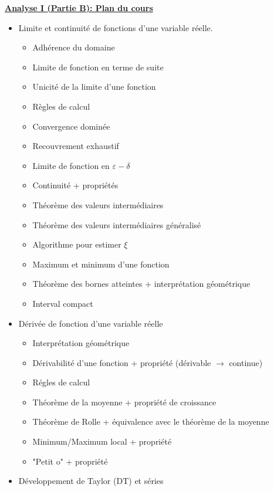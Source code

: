 \documentclass[a4paper,11pt]{report}
\begin{document}
\begin{center} 
   \underline{\textbf{Analyse I (Partie B): Plan du cours}} 
\end{center} 
\renewcommand{\labelitemi}{$\bullet$}
\renewcommand{\labelitemii}{$\cdot$}
\renewcommand{\labelitemiii}{$\diamond$}
\renewcommand{\labelitemiv}{$\ast$}
\begin{itemize}
	\item Limite et continuité de fonctions d'une variable réelle.
	\begin{itemize}
		\item Adhérence du domaine
		\item Limite de fonction en terme de suite
		\item Unicité de la limite d'une fonction
		\item Règles de calcul
		\item Convergence dominée
		\item Recouvrement exhaustif
		\item Limite de fonction en $\varepsilon-\delta$
		\item Continuité + propriétés
		\item Théorème des valeurs intermédiaires
		\item Théorème des valeurs intermédiaires généralisé
		\item Algorithme pour estimer $\xi$
		\item Maximum et minimum d'une fonction
		\item Théorème des bornes atteintes + interprétation géométrique
		\item Interval compact
	\end{itemize}
	\item Dérivée de fonction d'une variable réelle
	\begin{itemize}
		\item Interprétation géométrique
		\item Dérivabilité d'une fonction + propriété (dérivable $\rightarrow$ continue)
		\item Régles de calcul
		\item Théorème de la moyenne + propriété de croissance
		\item Théorème de Rolle + équivalence avec le théorème de la moyenne
		\item Minimum/Maximum local + propriété
		\item "Petit o" + propriété
	\end{itemize}
	\item Développement de Taylor (DT) et séries

\end{itemize}
\end{document}
